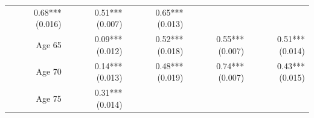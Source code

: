 \documentclass[]{article}
\begin{document}
\begin{longtable}[c]{@{}rrrrr@{}}
\begin{minipage}[t]{0.16\columnwidth}
0.68*** (0.016)
\strut\end{minipage} &
\begin{minipage}[t]{0.18\columnwidth}\raggedleft\strut
0.51*** (0.007)
\strut\end{minipage} &
\begin{minipage}[t]{0.15\columnwidth}\raggedleft\strut
0.65*** (0.013)
\strut\end{minipage}\tabularnewline
\begin{minipage}[t]{0.17\columnwidth}\raggedleft\strut
Age 65
\strut\end{minipage} &
\begin{minipage}[t]{0.20\columnwidth}\raggedleft\strut
0.09*** (0.012)
\strut\end{minipage} &
\begin{minipage}[t]{0.16\columnwidth}\raggedleft\strut
0.52*** (0.018)
\strut\end{minipage} &
\begin{minipage}[t]{0.18\columnwidth}\raggedleft\strut
0.55*** (0.007)
\strut\end{minipage} &
\begin{minipage}[t]{0.15\columnwidth}\raggedleft\strut
0.51*** (0.014)
\strut\end{minipage}\tabularnewline
\begin{minipage}[t]{0.17\columnwidth}\raggedleft\strut
Age 70
\strut\end{minipage} &
\begin{minipage}[t]{0.20\columnwidth}\raggedleft\strut
0.14*** (0.013)
\strut\end{minipage} &
\begin{minipage}[t]{0.16\columnwidth}\raggedleft\strut
0.48*** (0.019)
\strut\end{minipage} &
\begin{minipage}[t]{0.18\columnwidth}\raggedleft\strut
0.74*** (0.007)
\strut\end{minipage} &
\begin{minipage}[t]{0.15\columnwidth}\raggedleft\strut
0.43*** (0.015)
\strut\end{minipage}\tabularnewline
\begin{minipage}[t]{0.17\columnwidth}\raggedleft\strut
Age 75
\strut\end{minipage} &
\begin{minipage}[t]{0.20\columnwidth}\raggedleft\strut
0.31*** (0.014)
\strut\end{minipage} &
\begin{minipage}[t]{0.16\columnwidth}\raggedleft\strut

\end{minipage}
\end{longtable}
\end{document}
